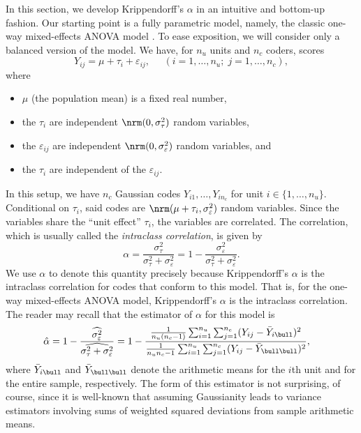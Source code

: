 In this section, we develop Krippendorff's $\alpha$ \citep{hayes2007answering} in an intuitive and bottom-up fashion. Our starting point is a fully parametric model, namely, the classic one-way mixed-effects ANOVA model \citep{ravishanker2001first}. To ease exposition, we will consider only a balanced version of the model. We have, for $n_u$ units and $n_c$ coders, scores
\[
Y_{ij} = \mu + \tau_i + \varepsilon_{ij},\;\;\;\;\;(i=1,\dots,n_u;\; j = 1,\dots,n_c),
\]
where
\begin{itemize}
\item $\mu$ (the population mean) is a fixed real number,
\item the $\tau_i$ are independent $\nrm(0,\sigma_\tau^2)$ random variables,
\item the $\varepsilon_{ij}$ are independent $\nrm(0,\sigma_\varepsilon^2)$ random variables, and
\item the $\tau_i$ are independent of the $\varepsilon_{ij}$.
\end{itemize}
In this setup, we have $n_c$ Gaussian codes $Y_{i1},\dots,Y_{in_c}$ for unit $i\in\{1,\dots,n_u\}$. Conditional on $\tau_i$, said codes are $\nrm(\mu+\tau_i,\sigma_\varepsilon^2)$ random variables. Since the variables share the ``unit effect'' $\tau_i$, the variables are correlated. The correlation, which is usually called the {\em intraclass correlation}, is given by
\[
\alpha=\frac{\sigma_\tau^2}{\sigma_\tau^2+\sigma_\varepsilon^2}=1-\frac{\sigma_\varepsilon^2}{\sigma_\tau^2+\sigma_\varepsilon^2}.
\]
We use $\alpha$ to denote this quantity precisely because Krippendorff's $\alpha$ is the intraclass correlation for codes that conform to this model. That is, for the one-way mixed-effects ANOVA model, Krippendorff's $\alpha$ is the intraclass correlation. The reader may recall that the estimator of $\alpha$ for this model is
\begin{align}
\label{intraclass}
\hat{\alpha}&=1-\frac{\widehat{\sigma_\varepsilon^2}}{\widehat{\sigma_\tau^2+\sigma_\varepsilon^2}}=1-\frac{\frac{1}{n_u(n_c-1)}\sum_{i=1}^{n_u}\sum_{j=1}^{n_c}(Y_{ij}-\bar{Y}_{i\bull})^2}{\frac{1}{n_un_c-1}\sum_{i=1}^{n_u}\sum_{j=1}^{n_c}(Y_{ij}-\bar{Y}_{\bull\bull})^2},
\end{align}
where $\bar{Y}_{i\bull}$ and $\bar{Y}_{\bull\bull}$ denote the arithmetic means for the $i$th unit and for the entire sample, respectively. The form of this estimator is not surprising, of course, since it is well-known that assuming Gaussianity leads to variance estimators involving sums of weighted squared deviations from sample arithmetic means.

